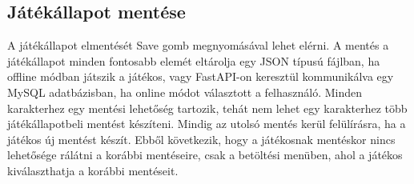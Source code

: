 \subsection{Játékállapot mentése} \label{subsec:Játékállapot mentése}
\indent \indent A játékállapot elmentését Save gomb megnyomásával lehet elérni. A mentés a játékállapot minden fontosabb elemét eltárolja egy JSON típusú fájlban, ha offline módban játszik a játékos, vagy FastAPI-on \cite{fastapi} keresztül kommunikálva egy MySQL \cite{mysql} adatbázisban, ha online módot választott a felhasználó. 
Minden karakterhez egy mentési lehetőség tartozik, tehát nem lehet egy karakterhez több játékállapotbeli mentést készíteni. Mindig az utolsó mentés kerül felülírásra, ha a játékos új mentést készít. Ebből következik, hogy a játékosnak mentéskor nincs lehetősége rálátni a korábbi mentéseire, csak a betöltési menüben, ahol a játékos kiválaszthatja a korábbi mentéseit.

